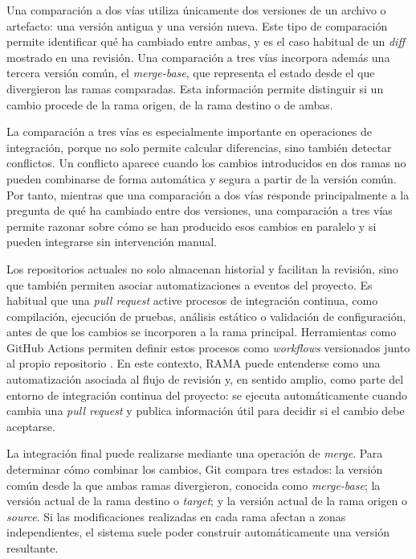 \documentclass[11pt]{article}
\begin{document}
Una comparación a dos vías utiliza únicamente dos versiones de un archivo o artefacto: una versión antigua y una versión nueva. Este tipo de comparación permite identificar qué ha cambiado entre ambas, y es el caso habitual de un \textit{diff} mostrado en una revisión. Una comparación a tres vías incorpora además una tercera versión común, el \textit{merge-base}, que representa el estado desde el que divergieron las ramas comparadas. Esta información permite distinguir si un cambio procede de la rama origen, de la rama destino o de ambas.

La comparación a tres vías es especialmente importante en operaciones de integración, porque no solo permite calcular diferencias, sino también detectar conflictos. Un conflicto aparece cuando los cambios introducidos en dos ramas no pueden combinarse de forma automática y segura a partir de la versión común. Por tanto, mientras que una comparación a dos vías responde principalmente a la pregunta de qué ha cambiado entre dos versiones, una comparación a tres vías permite razonar sobre cómo se han producido esos cambios en paralelo y si pueden integrarse sin intervención manual.

Los repositorios actuales no solo almacenan historial y facilitan la revisión, sino que también permiten asociar automatizaciones a eventos del proyecto. Es habitual que una \textit{pull request} active procesos de integración continua, como compilación, ejecución de pruebas, análisis estático o validación de configuración, antes de que los cambios se incorporen a la rama principal. Herramientas como GitHub Actions permiten definir estos procesos como \textit{workflows} versionados junto al propio repositorio \cite{github-actions}. En este contexto, RAMA puede entenderse como una automatización asociada al flujo de revisión y, en sentido amplio, como parte del entorno de integración continua del proyecto: se ejecuta automáticamente cuando cambia una \textit{pull request} y publica información útil para decidir si el cambio debe aceptarse.

La integración final puede realizarse mediante una operación de \textit{merge}. Para determinar cómo combinar los cambios, Git compara tres estados: la versión común desde la que ambas ramas divergieron, conocida como \textit{merge-base}; la versión actual de la rama destino o \textit{target}; y la versión actual de la rama origen o \textit{source}. Si las modificaciones realizadas en cada rama afectan a zonas independientes, el sistema suele poder construir automáticamente una versión resultante.
\end{document}
